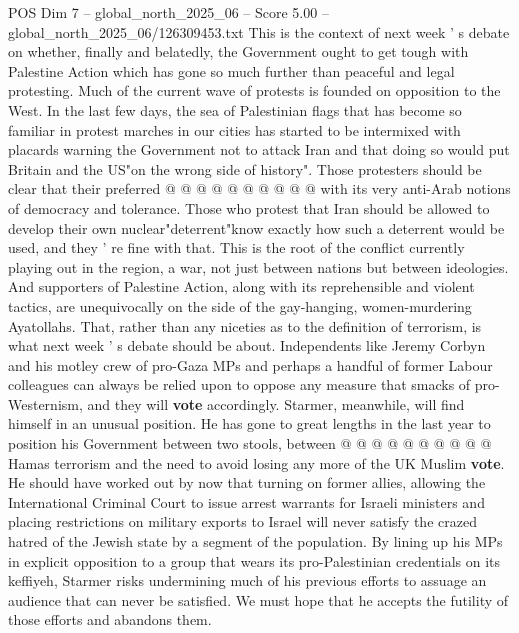 \begin{textsample}{POS Dim 7 – global\_north\_2025\_06 – Score 5.00 – global\_north\_2025\_06/126309453.txt}
This is the context of next week ' s debate on whether, finally and belatedly, the Government ought to get tough with Palestine Action which has gone so much further than peaceful and legal protesting.
Much of the current wave of protests is founded on opposition to the West.
In the last few days, the sea of Palestinian flags that has become so familiar in protest marches in our cities has started to be intermixed with placards warning the Government not to attack Iran and that doing so would put Britain and the US"on the wrong side of history".
Those protesters should be clear that their preferred @ @ @ @ @ @ @ @ @ @ with its very anti-Arab notions of democracy and tolerance.
Those who protest that Iran should be allowed to develop their own nuclear"deterrent"know exactly how such a deterrent would be used, and they ' re fine with that.
This is the root of the conflict currently playing out in the region, a war, not just between nations but between ideologies.
And supporters of Palestine Action, along with its reprehensible and violent tactics, are unequivocally on the side of the gay-hanging, women-murdering Ayatollahs.
That, rather than any niceties as to the definition of terrorism, is what next week ' s debate should be about.
Independents like Jeremy Corbyn and his motley crew of pro-Gaza MPs and perhaps a handful of former Labour colleagues can always be relied upon to oppose any measure that smacks of pro-Westernism, and they will \textbf{vote} accordingly.
Starmer, meanwhile, will find himself in an unusual position.
He has gone to great lengths in the last year to position his Government between two stools, between @ @ @ @ @ @ @ @ @ @ Hamas terrorism and the need to avoid losing any more of the UK Muslim \textbf{vote}.
He should have worked out by now that turning on former allies, allowing the International Criminal Court to issue arrest warrants for Israeli ministers and placing restrictions on military exports to Israel will never satisfy the crazed hatred of the Jewish state by a segment of the population.
By lining up his MPs in explicit opposition to a group that wears its pro-Palestinian credentials on its keffiyeh, Starmer risks undermining much of his previous efforts to assuage an audience that can never be satisfied.
We must hope that he accepts the futility of those efforts and abandons them.

\end{textsample}
